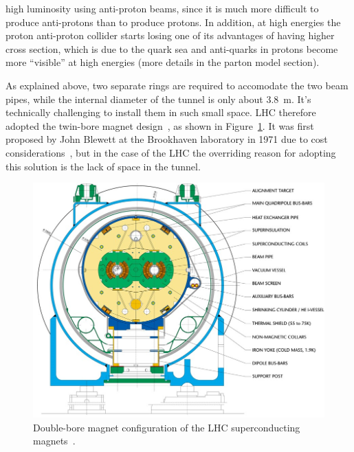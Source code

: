 high luminosity using anti-proton beams, since it is much more difficult 
to produce anti-protons than to produce protons. In addition, at high energies
the proton anti-proton collider starts losing one of its advantages of having higher cross section, 
which is due to the quark sea and anti-quarks in protons become more ``visible'' at high
energies (more details in the parton model section).

As explained above, two separate rings are required to accomodate the two beam pipes, while
the internal diameter of the tunnel is only about 3.8~m. It's technically challenging to 
install them in such small space. LHC therefore adopted the twin-bore magnet design~\cite{rossi2003lhc}, 
as shown in Figure~\ref{fig:double-bore-magnet}. It was first proposed by John Blewett at the Brookhaven 
laboratory in 1971 due to cost considerations~\cite{Blewett:1971zzb}, but in the case 
of the LHC the overriding reason for adopting this solution	is the lack of space in the tunnel. 
\begin{figure}[bht]
	\begin{centering}	
	\includegraphics[width=.7\textwidth]{Detector_plots/LHC-double-bore-magnet.jpg}
	\caption{ Double-bore magnet configuration of the LHC 
	superconducting magnets~\cite{rossi2003lhc}.}
	\label{fig:double-bore-magnet}
	\end{centering}
\end{figure}

